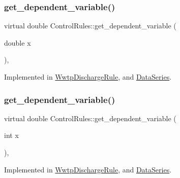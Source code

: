 \subsubsection{\texorpdfstring{get\+\_\+dependent\+\_\+variable()}{get\_dependent\_variable()}\hspace{0.1cm}{\footnotesize\ttfamily [1/4]}}
{\footnotesize\ttfamily virtual double Control\+Rules\+::get\+\_\+dependent\+\_\+variable (\begin{DoxyParamCaption}\item[{double}]{x }\end{DoxyParamCaption})\hspace{0.3cm}{\ttfamily [private]}, {}}



Implemented in \mbox{\hyperlink{classWwtpDischargeRule_a4cea07bf746d200c9ca3018405a77a46_a4cea07bf746d200c9ca3018405a77a46}{Wwtp\+Discharge\+Rule}}, and \mbox{\hyperlink{classDataSeries_a3cb684ebcbdd6d9969996f306bed8b53_a3cb684ebcbdd6d9969996f306bed8b53}{Data\+Series}}.

\mbox{\label{classControlRules_a56a42b40bf093237929a9c835dc9b772_a56a42b40bf093237929a9c835dc9b772}} 
\subsubsection{\texorpdfstring{get\+\_\+dependent\+\_\+variable()}{get\_dependent\_variable()}\hspace{0.1cm}{\footnotesize\ttfamily [2/4]}}
{\footnotesize\ttfamily virtual double Control\+Rules\+::get\+\_\+dependent\+\_\+variable (\begin{DoxyParamCaption}\item[{int}]{x }\end{DoxyParamCaption})\hspace{0.3cm}{\ttfamily [private]}, {}}



Implemented in \mbox{\hyperlink{classWwtpDischargeRule_a3338c0fc43d656a6730ca72dd5d3e51e_a3338c0fc43d656a6730ca72dd5d3e51e}{Wwtp\+Discharge\+Rule}}, and \mbox{\hyperlink{classDataSeries_a57c3737304a489a3ae9cae5910fc5337_a57c3737304a489a3ae9cae5910fc5337}{Data\+Series}}.

